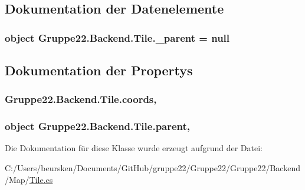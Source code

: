 \subsection{Dokumentation der Datenelemente}
\hypertarget{class_gruppe22_1_1_backend_1_1_tile_aee3960c872a95f378086b1655caddbcb}{
\subsubsection[{\-\_\-parent}]{\setlength{\rightskip}{0pt plus 5cm}object Gruppe22.\-Backend.\-Tile.\-\_\-parent = null\hspace{0.3cm}{\ttfamily [protected]}}}\label{class_gruppe22_1_1_backend_1_1_tile_aee3960c872a95f378086b1655caddbcb}


\subsection{Dokumentation der Propertys}
\hypertarget{class_gruppe22_1_1_backend_1_1_tile_a0fd463d0eb3f37522d0e4ff6692b9fcd}{
\subsubsection[{coords}]{ Gruppe22.\-Backend.\-Tile.\-coords\hspace{0.3cm}{\ttfamily [get]}, {\ttfamily [set]}}}\label{class_gruppe22_1_1_backend_1_1_tile_a0fd463d0eb3f37522d0e4ff6692b9fcd}
\hypertarget{class_gruppe22_1_1_backend_1_1_tile_abc12933c70eb3a2ebbb2fde9f45c2632}{
\subsubsection[{parent}]{\setlength{\rightskip}{0pt plus 5cm}object Gruppe22.\-Backend.\-Tile.\-parent\hspace{0.3cm}{\ttfamily [get]}, {\ttfamily [set]}}}\label{class_gruppe22_1_1_backend_1_1_tile_abc12933c70eb3a2ebbb2fde9f45c2632}


Die Dokumentation für diese Klasse wurde erzeugt aufgrund der Datei\-:\begin{DoxyCompactItemize}
\item 
C\-:/\-Users/beursken/\-Documents/\-Git\-Hub/gruppe22/\-Gruppe22/\-Gruppe22/\-Backend/\-Map/\hyperlink{_tile_8cs}{Tile.\-cs}\end{DoxyCompactItemize}
